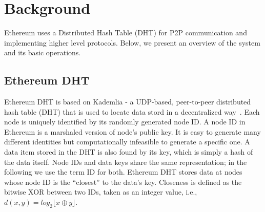 
\section{Background}
\label{sec:background}



Ethereum uses a Distributed Hash Table (DHT) for P2P communication and implementing higher level protocols. Below, we present an overview of the system and its basic operations. 

\subsection{Ethereum DHT}
Ethereum DHT is based on Kademlia - a UDP-based, peer-to-peer distributed hash table (DHT) that is used to locate data stord in a decentralized way~\cite{maymounkov2002kademlia}. Each node is uniquely identified by its randomly generated node ID. A node ID in Ethereum is a marshaled version of node's public key. It is easy to generate many different identities but computationally infeasible to generate a specific one. A data item stored in the DHT is also found by its key, which is simply a hash of the data itself. Node IDs and data keys share the same representation; in the following we use the term ID for both.
Ethereum DHT stores data at nodes whose node ID is the “closest” to the data’s key. Closeness is defined as the bitwise XOR between two IDs, taken as an integer value, i.e.,$d(x, y) = \textit{log}_2 \lfloor x \oplus y \rfloor$.


